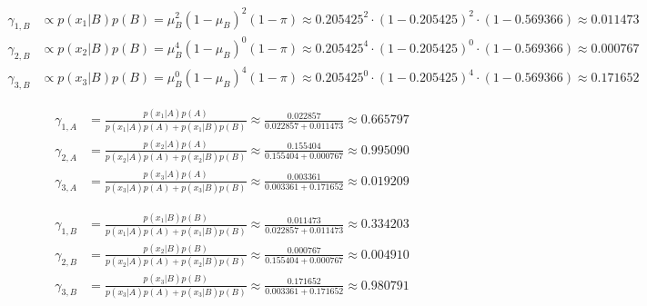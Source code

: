 \documentclass[12pt]{article}
\begin{document}
	\begin{align*}
		\gamma_{1,B} &\propto p\left(x_1 \vert B\right) p\left(B\right)
		= \mu_B^2 \left(1-\mu_B \right)^2 \left(1-\pi\right)
		\approx 0.205425^2 \cdot \left(1-0.205425\right)^2 \cdot \left(1-0.569366\right)
		\approx 0.011473 \\
		\gamma_{2,B} &\propto p\left(x_2 \vert B\right) p\left(B\right)
		= \mu_B^4 \left(1-\mu_B\right)^0 \left(1-\pi\right)
		\approx 0.205425^4 \cdot \left(1-0.205425\right)^0 \cdot \left(1-0.569366\right)
		\approx 0.000767 \\
		\gamma_{3,B} &\propto p\left(x_3 \vert B\right) p\left(B\right)
		= \mu_B^0 \left(1-\mu_B\right)^4 \left(1-\pi\right)
		\approx 0.205425^0 \cdot \left(1-0.205425\right)^4 \cdot \left(1-0.569366\right)
		\approx 0.171652
	\end{align*}

	\begin{align*}
		\gamma_{1,A} &= \frac{p\left(x_1 \vert A\right) p\left(A\right)}
		{p\left(x_1 \vert A\right) p\left(A\right)
		+ p\left(x_1 \vert B\right) p\left(B\right)}
		\approx \frac{0.022857}{0.022857+0.011473} \approx 0.665797 \\
		\gamma_{2,A} &= \frac{p\left(x_2 \vert A\right) p\left(A\right)}
		{p\left(x_2 \vert A\right) p\left(A\right)
		+ p\left(x_2 \vert B\right) p\left(B\right)}
		\approx \frac{0.155404}{0.155404+0.000767} \approx 0.995090 \\
		\gamma_{3,A} &= \frac{p\left(x_3 \vert A\right) p\left(A\right)}
		{p\left(x_3 \vert A\right) p\left(A\right)
		+ p\left(x_3 \vert B\right) p\left(B\right)}
		\approx \frac{0.003361}{0.003361+0.171652} \approx 0.019209
	\end{align*}

	\begin{align*}
		\gamma_{1,B} &= \frac{p\left(x_1 \vert B\right) p\left(B\right)}
		{p\left(x_1 \vert A\right) p\left(A\right)
		+ p\left(x_1 \vert B\right) p\left(B\right)}
		\approx \frac{0.011473}{0.022857+0.011473} \approx 0.334203 \\
		\gamma_{2,B} &= \frac{p\left(x_2 \vert B\right) p\left(B\right)}
		{p\left(x_2 \vert A\right) p\left(A\right)
		+ p\left(x_2 \vert B\right) p\left(B\right)}
		\approx \frac{0.000767}{0.155404+0.000767} \approx 0.004910 \\
		\gamma_{3,B} &= \frac{p\left(x_3 \vert B\right) p\left(B\right)}
		{p\left(x_3 \vert A\right) p\left(A\right)
		+ p\left(x_3 \vert B\right) p\left(B\right)}
		\approx \frac{0.171652}{0.003361+0.171652} \approx 0.980791
	\end{align*}
\end{document}
